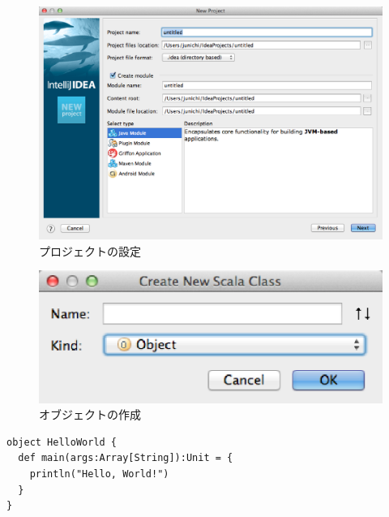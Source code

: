 \documentclass[10pt]{jarticle}
\begin{document}
\begin{figure}[hb]
  \centering
  \caption{プロジェクトの設定}
  \includegraphics[scale=0.5]{img/new_project.eps}
\end{figure}

\begin{figure}[hb]
  \centering
  \caption{オブジェクトの作成}
  \includegraphics[scale=0.5]{img/create_new_scala_class.eps}
\end{figure}

\begin{lstlisting}[label=src:helloworld, caption=HelloWorld.scala]
object HelloWorld {
  def main(args:Array[String]):Unit = {
    println("Hello, World!")
  }
}
\end{lstlisting}
\end{document}
